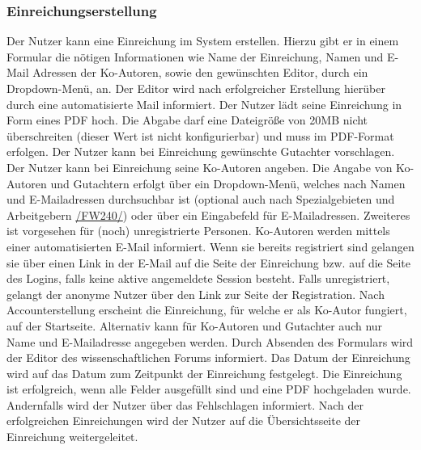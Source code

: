 \subsubsection{Einreichungserstellung}
\begin{description}
     Der Nutzer kann eine Einreichung im System erstellen. Hierzu gibt er in einem
    Formular die nötigen Informationen wie Name der Einreichung, Namen und E-Mail Adressen der Ko-Autoren,
    sowie den gewünschten Editor, durch ein Dropdown-Menü, an. Der Editor wird nach erfolgreicher Erstellung hierüber durch eine
    automatisierte Mail informiert.
     Der Nutzer lädt seine Einreichung in Form eines PDF hoch. Die Abgabe darf eine Dateigröße
    von 20MB nicht überschreiten (dieser Wert ist nicht konfigurierbar) und muss im PDF-Format erfolgen.
     Der Nutzer kann bei Einreichung gewünschte Gutachter vorschlagen.
     Der Nutzer kann bei Einreichung seine Ko-Autoren angeben.
     Die Angabe von Ko-Autoren und Gutachtern erfolgt über ein Dropdown-Menü, welches
    nach Namen und E-Mailadressen durchsuchbar ist (optional auch nach Spezialgebieten und Arbeitgebern \hyperref[funkt:240]{/FW240/})
    oder über ein Eingabefeld für E-Mailadressen. Zweiteres ist vorgesehen für (noch) unregistrierte Personen.
     Ko-Autoren werden mittels einer automatisierten E-Mail informiert. Wenn sie bereits
    registriert sind gelangen sie über einen Link in der E-Mail auf die Seite der Einreichung bzw. auf die Seite des Logins,
    falls keine aktive angemeldete Session besteht.
    Falls unregistriert, gelangt der anonyme Nutzer über den Link zur Seite der Registration. Nach Accounterstellung
    erscheint die Einreichung, für welche er als Ko-Autor fungiert, auf der Startseite.
    Alternativ kann für Ko-Autoren und Gutachter auch nur Name und E-Mailadresse angegeben werden.
     Durch Absenden des Formulars wird der Editor des wissenschaftlichen Forums
    informiert. Das Datum der Einreichung wird auf das Datum zum Zeitpunkt der Einreichung festgelegt.
     Die Einreichung ist erfolgreich, wenn alle Felder ausgefüllt sind und eine PDF
    hochgeladen wurde. Andernfalls wird der Nutzer über das Fehlschlagen informiert.
     Nach der erfolgreichen Einreichungen wird der Nutzer auf die Übersichtsseite der
    Einreichung weitergeleitet.
\end{description}

